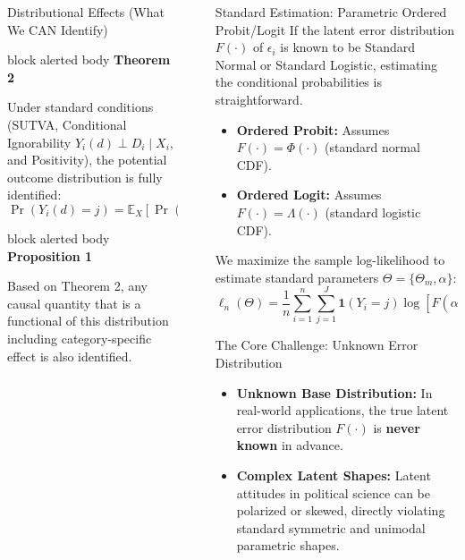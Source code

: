 \documentclass[final]{beamer}
\newlength{\sepwidth}
\newlength{\colwidth}
\newcommand{\separatorcolumn}{\begin{column}{\sepwidth}\end{column}}
\newcommand{\assumptionbox}[2]{%
\begin{beamercolorbox}[rounded=true,shadow=false,sep=0.6em,wd=\linewidth]{block alerted body}
\textbf{#1}\par\smallskip #2
\end{beamercolorbox}}
\begin{document}
\begin{frame}[t]
\begin{columns}[t,totalwidth=0.995\paperwidth]
\begin{column}{\colwidth}
\begin{block}{Distributional Effects (What We CAN Identify)}
\assumptionbox{Theorem 2}{
Under standard conditions (SUTVA, Conditional Ignorability $Y_i(d) \perp D_i \mid X_i$, and Positivity), the potential outcome distribution is fully identified:
\[
\Pr(Y_i(d) = j) = \mathbb{E}_X\left[ \Pr(Y_i = j \mid D_i=d, X_i) \right]
\]
  }
\assumptionbox{Proposition 1}{
  Based on Theorem 2, any causal quantity that is a functional of this
distribution including category-specific effect is also identified.
  }

\end{block}

\end{column}
\separatorcolumn

\begin{column}{\colwidth}

\begin{block}{Standard Estimation: Parametric Ordered Probit/Logit}
\justifying
If the latent error distribution $F(\cdot)$ of $\epsilon_i$ is known to be Standard Normal or Standard Logistic, estimating the conditional probabilities is straightforward.

\begin{itemize}\setlength\itemsep{0.25em}
  \item \textbf{Ordered Probit:} Assumes $F(\cdot) = \Phi(\cdot)$ (standard normal CDF).
  \item \textbf{Ordered Logit:} Assumes $F(\cdot) = \Lambda(\cdot)$ (standard logistic CDF).
\end{itemize}

We maximize the sample log-likelihood to estimate standard parameters $\Theta = \{\Theta_m, \alpha\}$:
\[
\ell_n(\Theta) = \frac{1}{n}\sum_{i=1}^n \sum_{j=1}^J \mathbf{1}(Y_i=j)\log\left[F(\alpha_j - m(X_i, D_i)) - F(\alpha_{j-1} - m(X_i, D_i))\right]
\]
\end{block}

\begin{block}{The Core Challenge: Unknown Error Distribution}
\justifying
\begin{itemize}\setlength\itemsep{0.3em}
  \item \textbf{Unknown Base Distribution:} In real-world applications, the true latent error distribution $F(\cdot)$ is \textbf{never known} in advance.
  \item \textbf{Complex Latent Shapes:} Latent attitudes in political science can be polarized or skewed, directly violating standard symmetric and unimodal parametric shapes.
\end{itemize}


\end{block}
\end{column}
\end{columns}
\end{frame}
\end{document}
